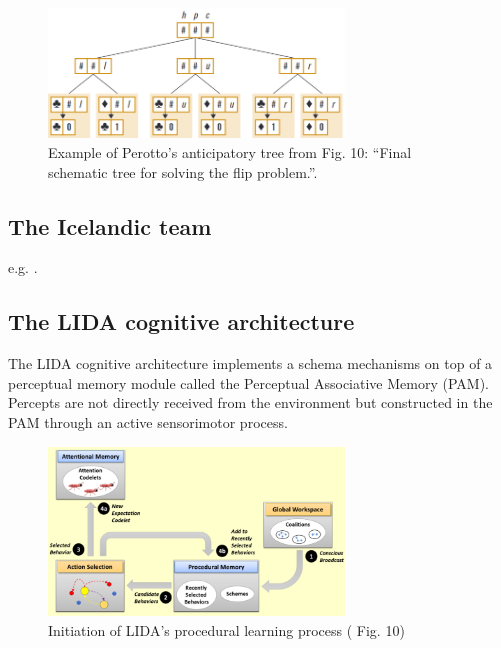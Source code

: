 \documentclass[runningheads]{llncs}
\begin{document}
\begin{figure}
	\centering
	\includegraphics[width=0.7\textwidth]{Figure_perotto_tree.png}
	\caption{Example of Perotto's anticipatory tree from \cite{perotto_computational_nodate} Fig. 10: ``Final schematic tree for solving the flip problem.''.
 } 
	\label{fig:perotto_tree}
\end{figure}



\subsection{The Icelandic team}

e.g. \cite{thorisson_seed-programmed_2020}.


\subsection{The LIDA cognitive architecture}

The LIDA cognitive architecture \cite{kugele_learning_2021}  implements a schema mechanisms on top of a perceptual memory module called the Perceptual Associative Memory (PAM). Percepts are not directly received from the environment but constructed in the PAM through an active sensorimotor process. 

\begin{figure}
	\centering
	\includegraphics[width=0.7\textwidth]{Figure_LIDA1.png}
	\caption{Initiation of LIDA's procedural learning process (\cite{kugele_learning_2021} Fig. 10)} 
	\label{fig:lida1}
\end{figure}
\end{document}
